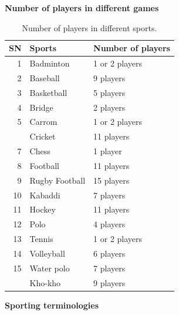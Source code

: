 \documentclass[
  openany]{book}
\begin{document}
\textbf{Number of players in different games}

\begin{table}[H]

\caption{\label{tab:sport-num-players}Number of players in different sports.}
\centering
\begin{tabular}[t]{rll}
\toprule
SN & Sports & Number of players\\
\midrule
\rowcolor{gray!6}  1 & Badminton & 1 or 2 players\\
2 & Baseball & 9 players\\
\rowcolor{gray!6}  3 & Basketball & 5 players\\
4 & Bridge & 2 players\\
\rowcolor{gray!6}  5 & Carrom & 1 or 2 players\\
\addlinespace
6 & Cricket & 11 players\\
\rowcolor{gray!6}  7 & Chess & 1 player\\
8 & Football & 11 players\\
\rowcolor{gray!6}  9 & Rugby Football & 15 players\\
10 & Kabaddi & 7 players\\
\addlinespace
\rowcolor{gray!6}  11 & Hockey & 11 players\\
12 & Polo & 4 players\\
\rowcolor{gray!6}  13 & Tennis & 1 or 2 players\\
14 & Volleyball & 6 players\\
\rowcolor{gray!6}  15 & Water polo & 7 players\\
\addlinespace
16 & Kho-kho & 9 players\\
\bottomrule
\end{tabular}
\end{table}

\textbf{Sporting terminologies}
\end{document}
